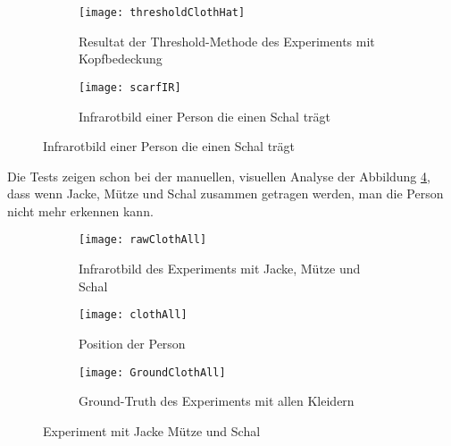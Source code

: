 \begin{figure}[H]
	\begin{subfigure}{.45\linewidth}
		\centering
		\texttt{[image: thresholdClothHat]}
		\caption{Resultat der Threshold-Methode des Experiments mit Kopfbedeckung}
		\label{fig:thresholdClothHat}
	\end{subfigure}
	\begin{subfigure}{.45\linewidth}
		\centering
		\texttt{[image: scarfIR]}
		\caption{Infrarotbild einer Person die einen Schal trägt}
		\label{fig:scarfIR}
	\end{subfigure}
	
\end{figure}

Die Tests zeigen schon bei der manuellen, visuellen Analyse der Abbildung \ref{fig:rawClothAll}, dass wenn Jacke, Mütze und Schal zusammen getragen werden, man die Person nicht mehr erkennen kann.

\begin{figure}[H]
	\begin{subfigure}{.45\linewidth}
		\centering
		\texttt{[image: rawClothAll]}
		\caption{Infrarotbild des Experiments mit Jacke, Mütze und Schal}
		\label{fig:rawClothAll}
	\end{subfigure}
	\begin{subfigure}{.45\linewidth}
		\centering
		\texttt{[image: clothAll]}
		\caption{Position der Person}
		\label{fig:AlgorithmsClothAll}
	\end{subfigure}
	\begin{subfigure}{\linewidth}
		\centering
		\texttt{[image: GroundClothAll]}
		\caption{Ground-Truth des Experiments mit allen Kleidern}
		\label{fig:groundTruthClothAll}
	\end{subfigure}
	\caption{Experiment mit Jacke Mütze und Schal}
	\label{fig:AllCloth}
\end{figure}

